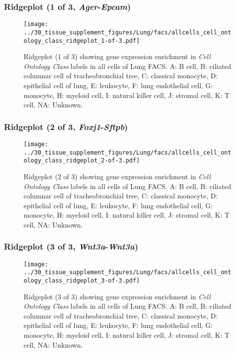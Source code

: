 \clearpage

\subsubsection{Ridgeplot (1 of 3, \emph{Ager}-\emph{Epcam})}
\begin{figure}[h]
\centering
\texttt{[image: ../30\_tissue\_supplement\_figures/Lung/facs/allcells\_cell\_ontology\_class\_ridgeplot\_1-of-3.pdf]}

\caption{ Ridgeplot (1 of 3)  showing gene expression enrichment in \emph{Cell Ontology Class} labels in all cells of Lung FACS. A: B cell, B: ciliated columnar cell of tracheobronchial tree, C: classical monocyte, D: epithelial cell of lung, E: leukocyte, F: lung endothelial cell, G: monocyte, H: myeloid cell, I: natural killer cell, J: stromal cell, K: T cell, NA: Unknown.}
\end{figure}


\clearpage

\subsubsection{Ridgeplot (2 of 3, \emph{Foxj1}-\emph{Sftpb})}
\begin{figure}[h]
\centering
\texttt{[image: ../30\_tissue\_supplement\_figures/Lung/facs/allcells\_cell\_ontology\_class\_ridgeplot\_2-of-3.pdf]}

\caption{ Ridgeplot (2 of 3)  showing gene expression enrichment in \emph{Cell Ontology Class} labels in all cells of Lung FACS. A: B cell, B: ciliated columnar cell of tracheobronchial tree, C: classical monocyte, D: epithelial cell of lung, E: leukocyte, F: lung endothelial cell, G: monocyte, H: myeloid cell, I: natural killer cell, J: stromal cell, K: T cell, NA: Unknown.}
\end{figure}


\clearpage

\subsubsection{Ridgeplot (3 of 3, \emph{Wnt3a}-\emph{Wnt3a})}
\begin{figure}[h]
\centering
\texttt{[image: ../30\_tissue\_supplement\_figures/Lung/facs/allcells\_cell\_ontology\_class\_ridgeplot\_3-of-3.pdf]}

\caption{ Ridgeplot (3 of 3)  showing gene expression enrichment in \emph{Cell Ontology Class} labels in all cells of Lung FACS. A: B cell, B: ciliated columnar cell of tracheobronchial tree, C: classical monocyte, D: epithelial cell of lung, E: leukocyte, F: lung endothelial cell, G: monocyte, H: myeloid cell, I: natural killer cell, J: stromal cell, K: T cell, NA: Unknown.}
\end{figure}


